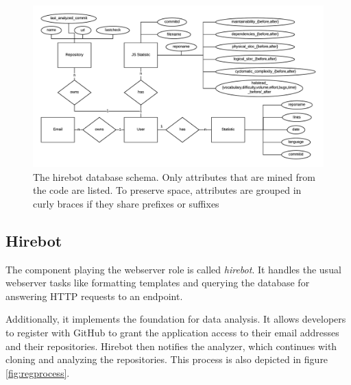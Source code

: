 \begin{figure}
  \centering
  \includegraphics[width=35em]{gfx/schema.png}
  \caption{The hirebot database schema. Only attributes that are mined from the code are listed. To preserve space, attributes are grouped in curly braces if they share prefixes or suffixes}
  \label{fig:schema}
\end{figure}

\subsection{Hirebot}
The component playing the webserver role is called \textit{hirebot}. It handles the usual webserver tasks like formatting templates and querying the database for answering HTTP requests to an endpoint.
\newline

Additionally, it implements the foundation for data analysis. It allows developers to register with GitHub to grant the application access to their email addresses and their repositories. Hirebot then notifies the analyzer, which continues with cloning and analyzing the repositories. This process is also depicted in figure \ref{fig:regprocess}.

